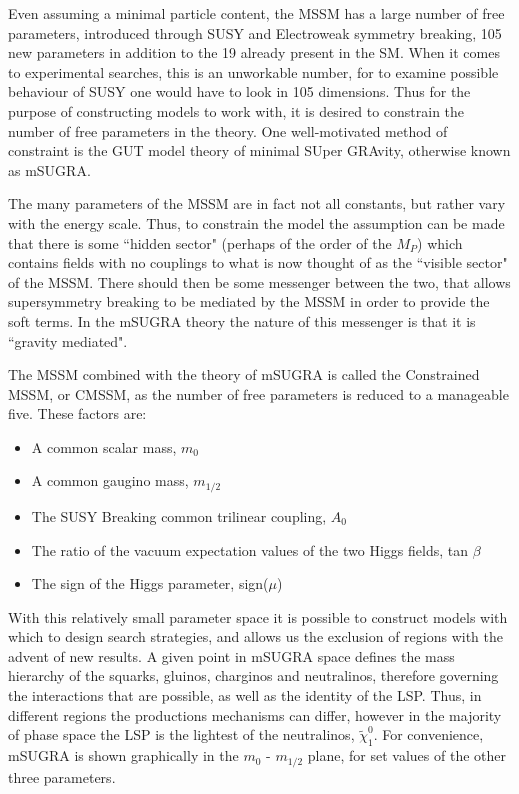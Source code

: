 Even assuming a minimal particle content, the MSSM has a large number of free parameters, introduced through SUSY and Electroweak symmetry breaking, 105 new parameters in addition to the 19 already present in the SM. When it comes to experimental searches, this is an unworkable number, for to examine possible behaviour of SUSY one would have to look in 105 dimensions. Thus for the purpose of constructing models to work with, it is desired to constrain the number of free parameters in the theory. One well-motivated method of constraint is the GUT model theory of minimal SUper GRAvity, otherwise known as mSUGRA. 

The many parameters of the MSSM are in fact not all constants, but rather vary with the energy scale. Thus, to constrain the model the assumption can be made that there is some ``hidden sector" (perhaps of the order of the $M_{P}$) which contains fields with no couplings to what is now thought of as the ``visible sector" of the MSSM. There should then be some messenger between the two, that allows supersymmetry breaking to be mediated by the MSSM in order to provide the soft terms. In the mSUGRA theory the nature of this messenger is that it is ``gravity mediated". 

The MSSM combined with the theory of mSUGRA is called the Constrained MSSM, or CMSSM, as the number of free parameters is reduced to a manageable five. These factors are:

\begin{itemize}
\item{A common scalar mass, $m_{0}$}
\item{A common gaugino mass, $m_{1/2}$}
\item{The SUSY Breaking common trilinear coupling, $A_{0}$}
\item{The ratio of the vacuum expectation values of the two Higgs fields, tan $\beta$}
\item{ The sign of the Higgs parameter, sign($\mu$)}
\end{itemize} 

With this relatively small parameter space it is possible to construct models with which to design search strategies, and allows us the exclusion of regions with the advent of new results. A given point in mSUGRA space defines the mass hierarchy of the squarks, gluinos, charginos and neutralinos, therefore governing the interactions that are possible, as well as the identity of the LSP. Thus, in different regions the productions mechanisms can differ, however in the majority of phase space the LSP is the lightest of the neutralinos, $\tilde{\chi}^{0}_{1}$.  For convenience, mSUGRA is shown graphically in the $m_{0}$ - $m_{1/2}$ plane, for set values of the other three parameters. 


